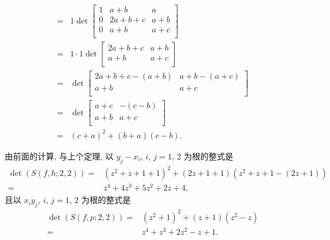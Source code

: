 \documentclass[../libro.tex]{subfiles}
\begin{document}
\begin{example}
\begin{align*}
{        }
        \\
        = {} &
        1
        \det {
            \begin{bmatrix}
                1 & a+b    & a   \\
                0 & 2a+b+c & a+b \\
                0 & a+b    & a+c \\
            \end{bmatrix}
        }
        \\
        = {} &
        1 \cdot 1
        \det {
            \begin{bmatrix}
                2a+b+c & a+b \\
                a+b    & a+c \\
            \end{bmatrix}
        }
        \\
        = {} &
        \det {
            \begin{bmatrix}
                2a+b+c-(a+b) & a+b-(a+c) \\
                a+b          & a+c       \\
            \end{bmatrix}
        }
        \\
        = {} &
        \det {
            \begin{bmatrix}
                a+c & -(c-b) \\
                a+b & a+c    \\
            \end{bmatrix}
        }
        \\
        = {} &
        (c + a)^2 + (b + a) (c - b).
    \end{align*}

    由前面的计算, 与上个定理,
    以
    \(y_j - x_i\), \(i\), \(j = 1\), \(2\)
    为根的整式是
    \begin{align*}
        \det {(S(f, h; 2, 2))}
        = {} &
        (z^2 + z + 1 + 1)^2
        + (2 z + 1 + 1) (z^2 + z + 1 - (2 z + 1))
        \\
        = {} &
        z^4 + 4 z^3 + 5 z^2 + 2 z + 4,
    \end{align*}
    且以
    \(x_i y_j\), \(i\), \(j = 1\), \(2\)
    为根的整式是
    \begin{align*}
        \det {(S(f, p; 2, 2))}
        = {} &
        (z^2 + 1)^2 + (z + 1) (z^2 - z)
        \\
        = {} &
        z^4 + z^3 + 2 z^2 - z + 1.
    \end{align*}


\end{example}
\end{document}
